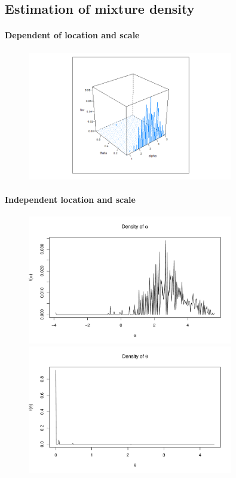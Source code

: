 
\subsection{Estimation of mixture density}
\paragraph{Dependent of location and scale}
\begin{figure}
    \centering
    \includegraphics[width=0.8\textwidth]{../../Figures/2016-2022/WGLVmix.png}
\end{figure}

\paragraph{Independent location and scale}
\begin{figure}
    \centering
    \includegraphics[width=0.8\textwidth]{../../Figures/2016-2022/WTLVmix_u.pdf}
    \includegraphics[width=0.8\textwidth]{../../Figures/2016-2022/WTLVmix_v.pdf}
\end{figure}

